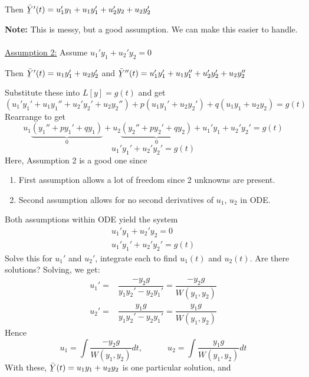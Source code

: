 \begin{center}
	Then $\Ylines'(t) = u_1'y_1 + u_1y_1' + u_2'y_2 + u_2y_2'$
\end{center}
\textbf{Note:} This is messy, but a good assumption. We can make this easier to handle.\\\\
\underline{Assumption 2:} Assume $\boxed{u_1'y_1 + u_2'y_2 = 0}$
\begin{center}
	Then $\Ylines'(t) = u_1y_1' + u_2y_2'$ and $\Ylines''(t) = u_1'y_1' + u_1y_1'' + u_2'y_2' + u_2y_2''$
\end{center}
Substitute these into $L[y] = g(t)$ and get
\begin{equation*}
	(u_1'y_1' + u_1y_1'' + u_2'y_2' + u_2y_2'') + p(u_1y_1' + u_2y_2') + q(u_1y_1 + u_2y_2) = g(t)
\end{equation*}
Rearrange to get
\begin{equation*}
	u_1\underbrace{(y_1'' + py_1' + qy_1)}_{0} + u_2\underbrace{(y_2'' + py_2' + qy_2)}_{0} + u_1'y_1 + u_2'y_2' = g(t)
\end{equation*}
\begin{equation*}
	\boxed{u_1'y_1' + u_2'y_2' = g(t)}
\end{equation*}
Here, Assumption 2 is a good one since
\begin{enumerate}[label=\protect\circled{\alph*}]
	\item First assumption allows a lot of freedom since 2 unknowns are present.
	\item Second assumption allows for no second derivatives of $u_1$, $u_2$ in ODE.
\end{enumerate}
Both assumptions within ODE yield the system
\begin{align*}
	u_1'y_1 + u_2'y_2 = 0\\
	u_1'y_1' + u_2'y_2' = g(t)
\end{align*}
Solve this for $u_1'$ and $u_2'$, integrate each to find $u_1(t)$ and $u_2(t)$. Are there solutions? Solving, we get:
\begin{align*}
	u_1' = & \dfrac{-y_2g}{y_1y_2' - y_2y_1'} = \dfrac{-y_2g}{W(y_1, y_2)}\\
	u_2' = & \dfrac{y_1g}{y_1y_2' - y_2y_1'} = \dfrac{y_1g}{W(y_1, y_2)}
\end{align*}
Hence
\begin{equation*}
	u_1 = \int \dfrac{-y_2g}{W(y_1, y_2)} dt, \quad \quad \quad u_2 = \int \dfrac{y_1g}{W(y_1, y_2)} dt
\end{equation*}
With these, $\Ylines(t) = u_1y_1 + u_2y_2$ is one particular solution, and 
